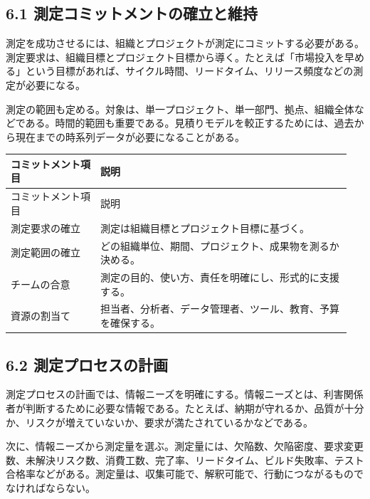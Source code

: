 \documentclass[a4paper,11pt]{ltjsarticle}
\begin{document}
\subsection{6.1 測定コミットメントの確立と維持}
測定を成功させるには、組織とプロジェクトが測定にコミットする必要がある。測定要求は、組織目標とプロジェクト目標から導く。たとえば「市場投入を早める」という目標があれば、サイクル時間、リードタイム、リリース頻度などの測定が必要になる。

測定の範囲も定める。対象は、単一プロジェクト、単一部門、拠点、組織全体などである。時間的範囲も重要である。見積りモデルを較正するためには、過去から現在までの時系列データが必要になることがある。

\begin{longtable}{>{\raggedright\arraybackslash}p{0.25\linewidth}>{\raggedright\arraybackslash}p{0.70\linewidth}}
\toprule
コミットメント項目 & 説明 \\
\midrule
\endfirsthead
\toprule
コミットメント項目 & 説明 \\
\midrule
\endhead
測定要求の確立 & 測定は組織目標とプロジェクト目標に基づく。 \\
測定範囲の確立 & どの組織単位、期間、プロジェクト、成果物を測るか決める。 \\
チームの合意 & 測定の目的、使い方、責任を明確にし、形式的に支援する。 \\
資源の割当て & 担当者、分析者、データ管理者、ツール、教育、予算を確保する。 \\
\bottomrule
\end{longtable}

\subsection{6.2 測定プロセスの計画}
測定プロセスの計画では、情報ニーズを明確にする。情報ニーズとは、利害関係者が判断するために必要な情報である。たとえば、納期が守れるか、品質が十分か、リスクが増えていないか、要求が満たされているかなどである。

次に、情報ニーズから測定量を選ぶ。測定量には、欠陥数、欠陥密度、要求変更数、未解決リスク数、消費工数、完了率、リードタイム、ビルド失敗率、テスト合格率などがある。測定量は、収集可能で、解釈可能で、行動につながるものでなければならない。
\end{document}
